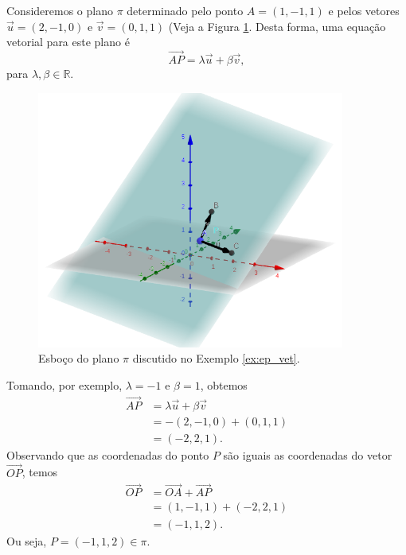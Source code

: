 \begin{ex}\label{ex:ep_vet}
  Consideremos o plano $\pi$ determinado pelo ponto $A = (1,-1,1)$ e pelos vetores $\vec{u} = (2,-1,0)$ e $\vec{v} = (0,1,1)$ (Veja a Figura \ref{fig:ex_ep_vet}. Desta forma, uma equação vetorial para este plano é
  \begin{equation}
    \overrightarrow{AP} = \lambda\vec{u}+\beta\vec{v},
  \end{equation}
  para $\lambda,\beta\in\mathbb{R}$.
  
  \begin{figure}[H]
    \centering
    \includegraphics[width=0.9\textwidth]{./cap_estudo/dados/fig_ex_ep_vet/fig_ex_ep_vet}
    \caption{Esboço do plano $\pi$ discutido no Exemplo \ref{ex:ep_vet}.}
    \label{fig:ex_ep_vet}
  \end{figure}
  
  Tomando, por exemplo, $\lambda = -1$ e $\beta = 1$, obtemos
  \begin{align}
    \overrightarrow{AP} &= \lambda\vec{u}+\beta\vec{v}\\
                        &= -(2,-1,0) + (0,1,1)\\
                        &= (-2,2,1).
  \end{align}
  Observando que as coordenadas do ponto $P$ são iguais as coordenadas do vetor $\overrightarrow{OP}$, temos
  \begin{align}
    \overrightarrow{OP} &= \overrightarrow{OA}+\overrightarrow{AP}\\
                        &= (1,-1,1)+(-2,2,1)\\
                        &= (-1,1,2).
  \end{align}
  Ou seja, $P = (-1,1,2)\in\pi$.
\end{ex}

